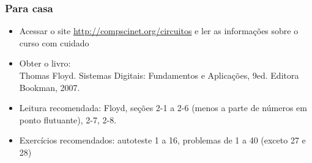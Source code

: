\documentclass{beamer}
\begin{document}
\begin{frame}
\frametitle{Para casa}

\begin{itemize}
\item Acessar o site \url{http://compscinet.org/circuitos} e ler as informações sobre o curso com cuidado
\pause
\item Obter o livro:\\
Thomas Floyd. Sistemas Digitais: Fundamentos e Aplicações, 9ed. Editora Bookman, 2007.
\pause
\item Leitura recomendada: Floyd, seções 2-1 a 2-6 (menos a parte de números em ponto flutuante), 2-7, 2-8.
\item Exercícios recomendados: autoteste 1 a 16, problemas de 1 a 40 (exceto 27 e 28)
\end{itemize}

\end{frame}
\end{document}
